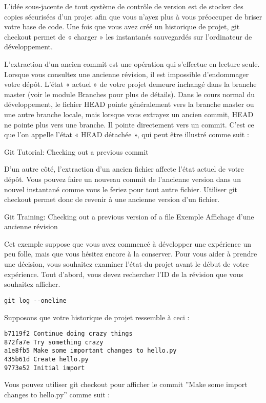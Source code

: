 \begin{itemize}
L'idée sous-jacente de tout système de contrôle de version est de stocker des copies sécurisées d'un projet afin que vous n'ayez plus à vous préoccuper de briser votre base de code. Une fois que vous avez créé un historique de projet, git checkout permet de « charger » les instantanés sauvegardés sur l'ordinateur de développement.

L'extraction d'un ancien commit est une opération qui s'effectue en lecture seule. Lorsque vous consultez une ancienne révision, il est impossible d'endommager votre dépôt. L'état « actuel » de votre projet demeure inchangé dans la branche master (voir le module Branches pour plus de détails). Dans le cours normal du développement, le fichier HEAD pointe généralement vers la branche master ou une autre branche locale, mais lorsque vous extrayez un ancien commit, HEAD ne pointe plus vers une branche. Il pointe directement vers un commit. C'est ce que l'on appelle l'état « HEAD détachée », qui peut être illustré comme suit :

Git Tutorial: Checking out a previous commit

D'un autre côté, l'extraction d'un ancien fichier affecte l'état actuel de votre dépôt. Vous pouvez faire un nouveau commit de l'ancienne version dans un nouvel instantané comme vous le feriez pour tout autre fichier. Utiliser git checkout permet donc de revenir à une ancienne version d'un fichier.

Git Training: Checking out a previous version of a file
Exemple
Affichage d'une ancienne révision

Cet exemple suppose que vous avez commencé à développer une expérience un peu folle, mais que vous hésitez encore à la conserver. Pour vous aider à prendre une décision, vous souhaitez examiner l'état du projet avant le début de votre expérience. Tout d'abord, vous devez rechercher l'ID de la révision que vous souhaitez afficher.

\begin{verbatim}
git log --oneline
\end{verbatim}

Supposons que votre historique de projet ressemble à ceci :

\begin{verbatim}
b7119f2 Continue doing crazy things
872fa7e Try something crazy
a1e8fb5 Make some important changes to hello.py
435b61d Create hello.py
9773e52 Initial import
\end{verbatim}

Vous pouvez utiliser git checkout pour afficher le commit ''Make some import changes to hello.py'' comme suit :


\end{itemize}

